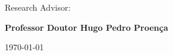 \vspace{0,5cm}
\begin{center}
\begin{normalsize}
\begin{large}
Research Advisor:
\end{large}
\end{normalsize}
\end{center}

\vspace{0.2cm}
\begin{center}
\begin{large}
\textbf{Professor Doutor Hugo Pedro Proença}
\end{large}
\end{center}



\vspace{0.5cm}
\begin{center}
\begin{normalsize}
\today
\end{normalsize}
\end{center}

